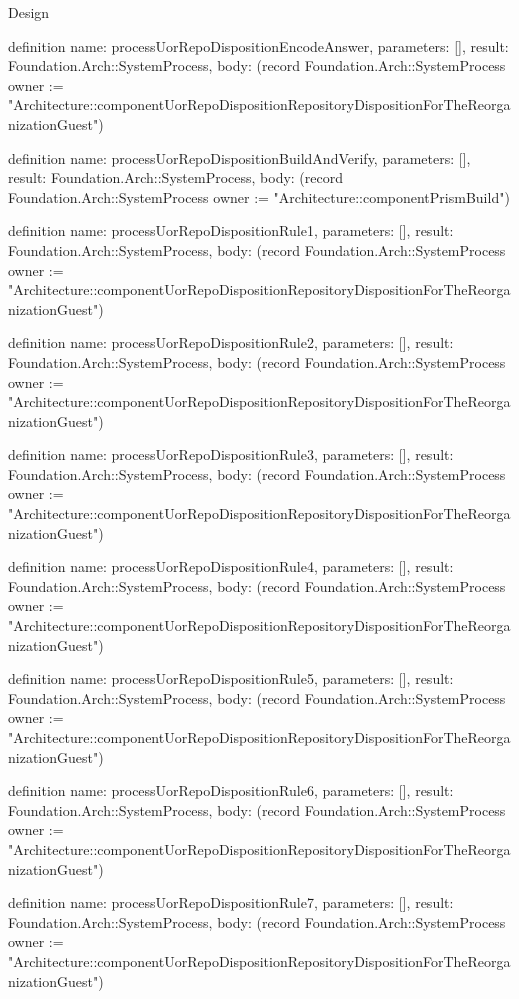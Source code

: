 \begin{lexlean}{Design}
\begin{semanticmodule}
definition{
  name: processUorRepoDispositionEncodeAnswer,
  parameters: [],
  result: Foundation.Arch::SystemProcess,
  body: (record Foundation.Arch::SystemProcess {owner := "Architecture::componentUorRepoDispositionRepositoryDispositionForTheReorganizationGuest"})
}

definition{
  name: processUorRepoDispositionBuildAndVerify,
  parameters: [],
  result: Foundation.Arch::SystemProcess,
  body: (record Foundation.Arch::SystemProcess {owner := "Architecture::componentPrismBuild"})
}

definition{
  name: processUorRepoDispositionRule1,
  parameters: [],
  result: Foundation.Arch::SystemProcess,
  body: (record Foundation.Arch::SystemProcess {owner := "Architecture::componentUorRepoDispositionRepositoryDispositionForTheReorganizationGuest"})
}

definition{
  name: processUorRepoDispositionRule2,
  parameters: [],
  result: Foundation.Arch::SystemProcess,
  body: (record Foundation.Arch::SystemProcess {owner := "Architecture::componentUorRepoDispositionRepositoryDispositionForTheReorganizationGuest"})
}

definition{
  name: processUorRepoDispositionRule3,
  parameters: [],
  result: Foundation.Arch::SystemProcess,
  body: (record Foundation.Arch::SystemProcess {owner := "Architecture::componentUorRepoDispositionRepositoryDispositionForTheReorganizationGuest"})
}

definition{
  name: processUorRepoDispositionRule4,
  parameters: [],
  result: Foundation.Arch::SystemProcess,
  body: (record Foundation.Arch::SystemProcess {owner := "Architecture::componentUorRepoDispositionRepositoryDispositionForTheReorganizationGuest"})
}

definition{
  name: processUorRepoDispositionRule5,
  parameters: [],
  result: Foundation.Arch::SystemProcess,
  body: (record Foundation.Arch::SystemProcess {owner := "Architecture::componentUorRepoDispositionRepositoryDispositionForTheReorganizationGuest"})
}

definition{
  name: processUorRepoDispositionRule6,
  parameters: [],
  result: Foundation.Arch::SystemProcess,
  body: (record Foundation.Arch::SystemProcess {owner := "Architecture::componentUorRepoDispositionRepositoryDispositionForTheReorganizationGuest"})
}

definition{
  name: processUorRepoDispositionRule7,
  parameters: [],
  result: Foundation.Arch::SystemProcess,
  body: (record Foundation.Arch::SystemProcess {owner := "Architecture::componentUorRepoDispositionRepositoryDispositionForTheReorganizationGuest"})
}


\end{semanticmodule}
\end{lexlean}
